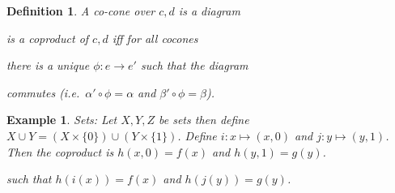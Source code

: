 \documentclass[a4paper,12pt]{article}
\newtheorem{defn}[thm]{Definition}
\newtheorem{eg}[thm]{Example}
\begin{document}
\begin{defn}
    A co-cone over $c,d$ is a diagram
    \begin{center}
    \end{center}
is a coproduct of $c,d$ iff for all cocones
    \begin{center}
    \end{center}
    there is a unique $\phi: e \to e'$ such that the diagram
    \begin{center}
    \end{center}
    commutes (i.e.\ $\alpha' \circ \phi = \alpha$ and $\beta' \circ \phi = \beta$).
\end{defn}
\begin{eg}
    Sets: Let $X,Y,Z$ be sets then define $X\cup Y=(X \times \{0\}) \cup (Y \times \{1\})$. Define $i:x \mapsto (x,0)$ and $j:y \mapsto (y,1)$. Then the coproduct is $h(x,0)=f(x)$ and $h(y,1)=g(y)$.
    \begin{center}
    \end{center}
    such that $h(i(x))=f(x)$ and $h(j(y))=g(y)$.
\end{eg}
\end{document}
